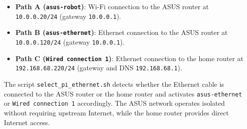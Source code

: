 \begin{itemize}
\item \textbf{Path A (\texttt{asus-robot})}: Wi-Fi connection to the ASUS router at \texttt{10.0.0.20/24} (gateway \texttt{10.0.0.1}).
\item \textbf{Path B (\texttt{asus-ethernet})}: Ethernet connection to the ASUS router at \texttt{10.0.0.120/24} (gateway \texttt{10.0.0.1}).
\item \textbf{Path C (\texttt{Wired connection 1})}: Ethernet connection to the home router at \texttt{192.168.68.220/24} (gateway and DNS \texttt{192.168.68.1}).
\end{itemize}

The script \texttt{select\_pi\_ethernet.sh} detects whether the Ethernet cable is connected to the ASUS router or the home router and activates \texttt{asus-ethernet} or \texttt{Wired connection 1} accordingly. The ASUS network operates isolated without requiring upstream Internet, while the home router provides direct Internet access.
